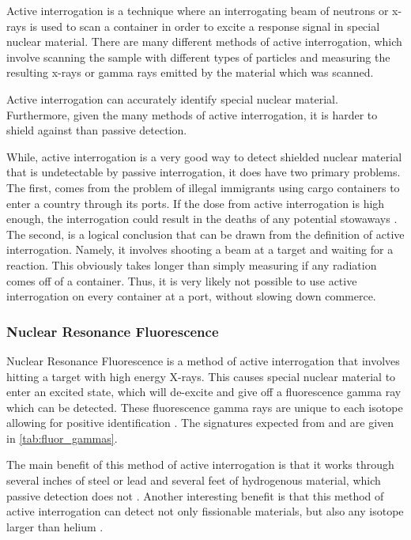 \documentclass{report}
\begin{document}
Active interrogation is a technique where an interrogating beam of neutrons or x-rays is used to scan a container in order to excite a response signal in special nuclear material. There are many different methods of active interrogation, which involve scanning the sample with different types of particles and measuring the resulting x-rays or gamma rays emitted by the material which was scanned.

Active interrogation can accurately identify special nuclear material. Furthermore, given the many methods of active interrogation, it is harder to shield against than passive detection.

While, active interrogation is a very good way to detect shielded nuclear material that is undetectable by passive interrogation, it does have two primary problems. The first, comes from the problem of illegal immigrants using cargo containers to enter a country through its ports. If the dose from active interrogation is high enough, the interrogation could result in the deaths of any potential stowaways \cite{Morse2014}. The second, is a logical conclusion that can be drawn from the definition of active interrogation. Namely, it involves shooting a beam at a target and waiting for a reaction. This obviously takes longer than simply measuring if any radiation comes off of a container. Thus, it is very likely not possible to use active interrogation on every container at a port, without slowing down commerce.

\subsubsection{Nuclear Resonance Fluorescence}

Nuclear Resonance Fluorescence is a method of active interrogation that involves hitting a target with high energy X-rays. This causes special nuclear material to enter an excited state, which will de-excite and give off a fluorescence gamma ray which can be detected. These fluorescence gamma rays are unique to each isotope allowing for positive identification \cite{Morse2014a}. The signatures expected from  and  are given in \autoref{tab:fluor_gammas}.

The main benefit of this method of active interrogation is that it works through several inches of steel or lead and several feet of hydrogenous material, which passive detection does not \cite{PhysRevC.78.041601}. Another interesting benefit is that this method of active interrogation can detect not only fissionable materials, but also any isotope larger than helium \cite{Bertozzi2005}.
\end{document}
